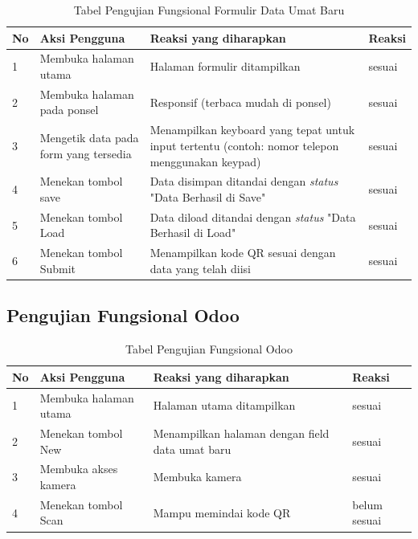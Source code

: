 \begin{table}[H]
	\centering
	\caption{Tabel Pengujian Fungsional Formulir Data Umat Baru}
	\begin{tabular}{|p{0.5cm}| p{5cm}| p{6cm}| p{2.5cm}|} \hline
		No	&	Aksi Pengguna	&	Reaksi yang diharapkan	&	Reaksi \\ \hline
		1 	&  Membuka halaman utama & Halaman formulir ditampilkan &	sesuai	\\ \hline
		2 	&  Membuka halaman pada ponsel & Responsif (terbaca mudah di ponsel) &	sesuai	\\ \hline
		3 	&  Mengetik data pada form yang tersedia & Menampilkan keyboard yang tepat untuk input tertentu (contoh: nomor telepon menggunakan keypad) &	sesuai	\\ \hline
		4 	&  Menekan tombol save & Data disimpan ditandai dengan \textit{status} "Data Berhasil di Save" &	sesuai	\\ \hline
		5 	&  Menekan tombol Load & Data diload ditandai dengan \textit{status} "Data Berhasil di Load" &	sesuai	\\ \hline
		6 	&  Menekan tombol Submit & Menampilkan kode QR sesuai dengan data yang telah diisi &	sesuai	\\ \hline
	\end{tabular}
	\label{table:fungsionalFormulir}
\end{table}

\subsection{Pengujian Fungsional Odoo}
\label{sec:pengujianFungsionalOdoo}

\begin{table}[H]
	\centering
	\caption{Tabel Pengujian Fungsional Odoo}
	\begin{tabular}{|p{0.5cm}| p{5cm}| p{6cm}| p{2.5cm}|} \hline
		No	&	Aksi Pengguna	&	Reaksi yang diharapkan	&	Reaksi \\ \hline
		1 	&  Membuka halaman utama & Halaman utama ditampilkan &	sesuai	\\ \hline
		2 	&  Menekan tombol New & Menampilkan halaman dengan field data umat baru &	sesuai	\\ \hline
		3 	&  Membuka akses kamera & Membuka kamera &	sesuai	\\ \hline
		4 	&  Menekan tombol Scan & Mampu memindai kode QR  &	belum sesuai	\\ \hline
	\end{tabular}
	\label{table:fungsionalOdoo}
\end{table}

